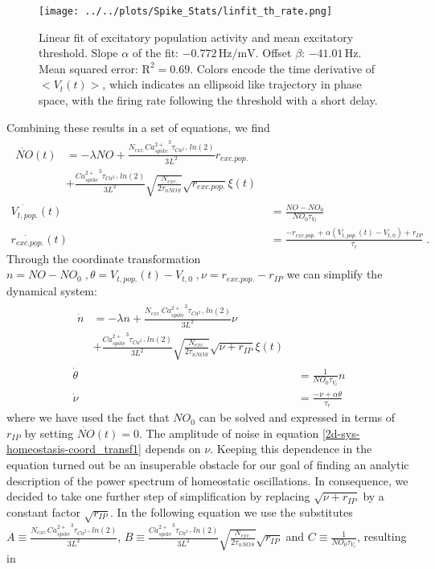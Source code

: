 \documentclass[10pt,a4paper]{article}
\begin{document}
\begin{figure}
\texttt{[image: ../../plots/Spike\_Stats/linfit\_th\_rate.png]}
\caption{Linear fit of excitatory population activity and mean excitatory threshold. Slope $\alpha$ of the fit: $\mathrm{-0.772\, Hz/mV}$. Offset $\beta$: $\mathrm{-41.01\, Hz}$. Mean squared error: $\mathrm{R^2 = 0.69}$. Colors encode the time derivative of $<V_t(t)>$, which indicates an ellipsoid like trajectory in phase space, with the firing rate following the threshold with a short delay.}
\label{thresh_r_linfit}
\end{figure}

Combining these results in a set of equations, we find
\begin{align}
\begin{split}
\dot{NO}(t) &= - \lambda NO + \frac{ N_{exc.} {Ca^{2+}_{spike}}^3 \tau_{Ca^{2+}}ln(2)}{3 L^2}r_{exc.pop.} \\
&+ \frac{{Ca^{2+}_{spike}}^3 {\tau_{Ca^{2+}}} ln(2)}{3L^2}\sqrt{\frac{N_{exc.}}{2 \tau_{nNOS}}}\sqrt{r_{exc.pop.}}\xi (t)
\end{split}\label{2d-sys-homeostasis1}\\
\dot{V_{t,pop.}}(t) &= \frac{NO-NO_0}{NO_0 \tau_{V_t}} \label{2d-sys-homeostasis2} \\
\dot{r_{exc.pop.}}(t) &= \frac{-r_{exc.pop.}+\alpha(V_{t,pop.}(t)-V_{t,0}) + r_{IP}}{\tau_r}\;. \label{2d-sys-homeostasis3}
\end{align}
Through the coordinate transformation $n = NO-NO_0 \; , \theta = V_{t,pop.}(t)-V_{t,0}\; , \nu = r_{exc.pop.} - r_{IP}$ we can simplify the dynamical system:
\begin{align}
\begin{split}
\dot{n} &= -\lambda n + \frac{N_{exc.} {Ca^{2+}_{spike}}^3 \tau_{Ca^{2+}}ln(2)}{3 L^2}\nu \\
&+ \frac{{Ca^{2+}_{spike}}^3 {\tau_{Ca^{2+}}} ln(2)}{3L^2}\sqrt{\frac{N_{exc.}}{2 \tau_{nNOS}}}\sqrt{\nu + r_{IP}}\xi (t)
\end{split}\label{2d-sys-homeostasis-coord_transf1}\\
\dot{\theta} &= \frac{1}{NO_0 \tau_{V_t}} n \label{2d-sys-homeostasis-coord_transf2} \\
\dot{\nu} &= \frac{-\nu + \alpha \theta}{\tau_r} \label{2d-sys-homeostasis-coord_transf3}
\end{align}
where we have used the fact that $NO_0$ can be solved and expressed in terms of $r_{IP}$ by setting $\dot{NO}(t) = 0$. The amplitude of noise in equation \ref{2d-sys-homeostasis-coord_transf1} depends on $\nu$. Keeping this dependence in the equation turned out be an insuperable obstacle for our goal of finding an analytic description of the power spectrum of homeostatic oscillations. In consequence, we decided to take one further step of simplification by replacing $\sqrt{\nu + r_{IP}}$ by a constant factor $\sqrt{r_{IP}}$. In the following equation we use the substitutes $A\equiv \frac{N_{exc.} {Ca^{2+}_{spike}}^3 \tau_{Ca^{2+}}ln(2)}{3 L^2}$, $B\equiv \frac{{Ca^{2+}_{spike}}^3 {\tau_{Ca^{2+}}} ln(2)}{3L^2}\sqrt{\frac{N_{exc.}}{2 \tau_{nNOS}}}\sqrt{r_{IP}}$ and $C\equiv \frac{1}{NO_0 \tau_{V_t}}$, resulting in
\end{document}
